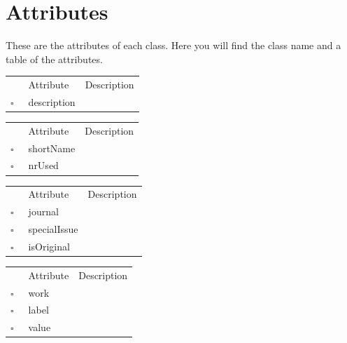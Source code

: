 \chapter{Attributes}
These are the attributes of each class. Here you will find the class name and a table of the attributes.     
\begin{table}
\caption{Acronym  }

\begin{longtable}{llp{8cm}}
& Attribute & Description \\
$\square$\ & description &  \\
\end{longtable}
\label{attr:Acronym}
\end{table}

\clearpage
\begin{table}
\caption{Affiliation  }

\begin{longtable}{llp{8cm}}
& Attribute & Description \\
$\square$\ & shortName &  \\
$\square$\ & nrUsed &  \\
\end{longtable}
\label{attr:Affiliation}
\end{table}

\begin{table}
\caption{Article  }

\begin{longtable}{llp{8cm}}
& Attribute & Description \\
$\square$\ & journal &  \\
$\square$\ & specialIssue &  \\
$\square$\ & isOriginal &  \\
\end{longtable}
\label{attr:Article}
\end{table}

\begin{table}
\caption{Assertion  }

\begin{longtable}{llp{8cm}}
& Attribute & Description \\
$\square$\ & work &  \\
$\square$\ & label &  \\
$\square$\ & value &  \\
\end{longtable}
\label{attr:Assertion}
\end{table}

